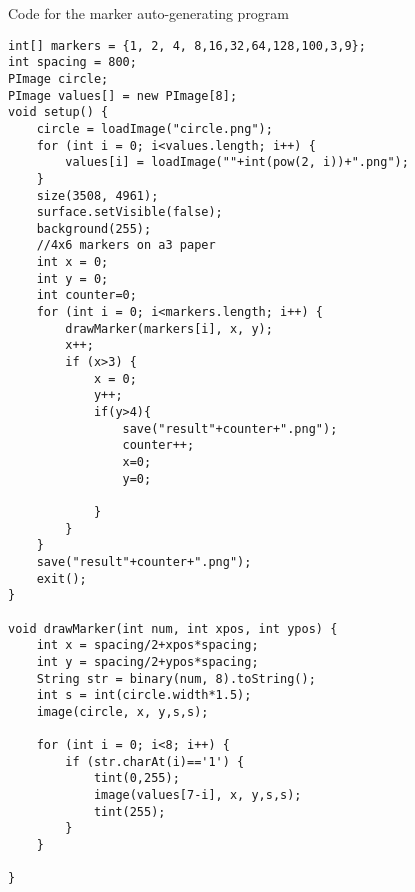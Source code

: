 \begin{listing}[H]
	\caption{Code for the marker auto-generating program}
	\label{listing:generatorCode}
	\begin{verbatim}
int[] markers = {1, 2, 4, 8,16,32,64,128,100,3,9};
int spacing = 800;
PImage circle;
PImage values[] = new PImage[8];
void setup() {
	circle = loadImage("circle.png");
	for (int i = 0; i<values.length; i++) {
		values[i] = loadImage(""+int(pow(2, i))+".png");
	}
	size(3508, 4961);
	surface.setVisible(false);
	background(255);
	//4x6 markers on a3 paper
	int x = 0;
	int y = 0;
	int counter=0;
	for (int i = 0; i<markers.length; i++) {
		drawMarker(markers[i], x, y);
		x++;
		if (x>3) {
			x = 0;
			y++;
			if(y>4){
				save("result"+counter+".png");
				counter++;
				x=0;
				y=0;
				
			}
		}
	}
	save("result"+counter+".png");
	exit();
}

void drawMarker(int num, int xpos, int ypos) {
	int x = spacing/2+xpos*spacing;
	int y = spacing/2+ypos*spacing;
	String str = binary(num, 8).toString();
	int s = int(circle.width*1.5);
	image(circle, x, y,s,s);
	
	for (int i = 0; i<8; i++) {
		if (str.charAt(i)=='1') {
			tint(0,255);
			image(values[7-i], x, y,s,s);
			tint(255);
		}
	}
	
}
	\end{verbatim}
\end{listing}

